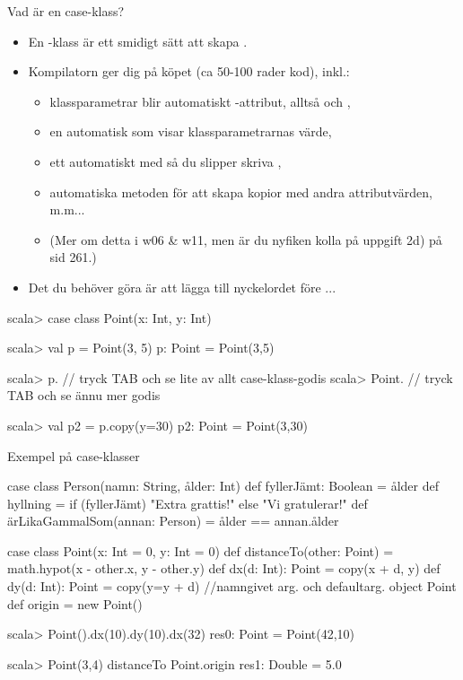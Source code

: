 \begin{Slide}{Vad är en case-klass?}\SlideFontSmall
\setlength{\leftmargini}{0pt}
\begin{itemize}
\item En -klass är ett smidigt sätt att skapa .
\item Kompilatorn ger dig  på köpet (ca 50-100 rader kod), inkl.:
\begin{itemize}\SlideFontTiny
\item klassparametrar blir automatiskt -attribut, alltså  och ,
\item en automatisk  som visar klassparametrarnas värde, 
\item ett automatiskt  med  så du slipper skriva ,
\item automatiska metoden  för att skapa kopior med andra attributvärden, m.m...
\item[] (Mer om detta i w06 \& w11, men är du nyfiken kolla på uppgift 2d) på sid 261.)
\end{itemize}

\pause
\item Det  du behöver göra är att lägga till nyckelordet  före ...
\end{itemize}

\vspace{-0.5em}\begin{REPLnonum}
scala> case class Point(x: Int, y: Int)

scala> val p = Point(3, 5)
p: Point = Point(3,5)

scala> p.  // tryck TAB och se lite av allt case-klass-godis
scala> Point.  // tryck TAB och se ännu mer godis

scala> val p2 = p.copy(y=30)
p2: Point = Point(3,30)
\end{REPLnonum}


\end{Slide}


\begin{Slide}{Exempel på case-klasser} 
\begin{Code}
case class Person(namn: String, ålder: Int) {
  def fyllerJämt: Boolean = ålder %
  def hyllning = if (fyllerJämt) "Extra grattis!" else "Vi gratulerar!"
  def ärLikaGammalSom(annan: Person) = ålder == annan.ålder
}

case class Point(x: Int = 0, y: Int = 0) {
  def distanceTo(other: Point) = math.hypot(x - other.x, y - other.y)
  def dx(d: Int): Point = copy(x + d, y)
  def dy(d: Int): Point = copy(y=y + d)  //namngivet arg. och defaultarg.
}
object Point { 
  def origin = new Point() 
}
\end{Code}

\begin{REPL}
scala> Point().dx(10).dy(10).dx(32)
res0: Point = Point(42,10)

scala> Point(3,4) distanceTo Point.origin
res1: Double = 5.0

\end{REPL}
\end{Slide}

